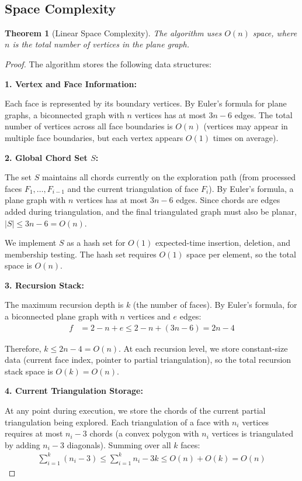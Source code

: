 ﻿﻿\documentclass[12pt,a4paper]{article}
\newtheorem{theorem}{Theorem}
\theoremstyle{definition}
\theoremstyle{remark}
\begin{document}
\subsection{Space Complexity}

\begin{theorem}[Linear Space Complexity]
	\label{thm:space_complexity}
	The algorithm uses $O(n)$ space, where $n$ is the total number of vertices in the plane graph.
\end{theorem}

\begin{proof}
	The algorithm stores the following data structures:

	\textbf{1. Vertex and Face Information:}

	Each face is represented by its boundary vertices. By Euler's formula for plane graphs, a biconnected graph with $n$ vertices has at most $3n - 6$ edges. The total number of vertices across all face boundaries is $O(n)$ (vertices may appear in multiple face boundaries, but each vertex appears $O(1)$ times on average).

	\textbf{2. Global Chord Set $S$:}

	The set $S$ maintains all chords currently on the exploration path (from processed faces $F_1, \ldots, F_{i-1}$ and the current triangulation of face $F_i$). By Euler's formula, a plane graph with $n$ vertices has at most $3n - 6$ edges. Since chords are edges added during triangulation, and the final triangulated graph must also be planar, $|S| \leq 3n - 6 = O(n)$.

	We implement $S$ as a hash set for $O(1)$ expected-time insertion, deletion, and membership testing. The hash set requires $O(1)$ space per element, so the total space is $O(n)$.

	\textbf{3. Recursion Stack:}

	The maximum recursion depth is $k$ (the number of faces). By Euler's formula, for a biconnected plane graph with $n$ vertices and $e$ edges:
	\begin{align*}
		f & = 2 - n + e \leq 2 - n + (3n - 6) = 2n - 4
	\end{align*}

	Therefore, $k \leq 2n - 4 = O(n)$. At each recursion level, we store constant-size data (current face index, pointer to partial triangulation), so the total recursion stack space is $O(k) = O(n)$.

	\textbf{4. Current Triangulation Storage:}

	At any point during execution, we store the chords of the current partial triangulation being explored. Each triangulation of a face with $n_i$ vertices requires at most $n_i - 3$ chords (a convex polygon with $n_i$ vertices is triangulated by adding $n_i - 3$ diagonals). Summing over all $k$ faces:
	\begin{align*}
		\sum_{i=1}^{k} (n_i - 3) \leq \sum_{i=1}^{k} n_i - 3k \leq O(n) + O(k) = O(n)
	\end{align*}


\end{proof}
\end{document}
